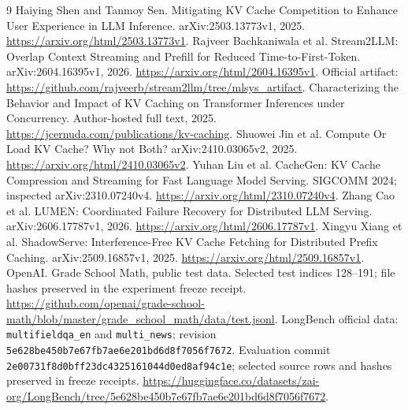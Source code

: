 \documentclass[UTF8,fontset=fandol,a4paper,10pt]{ctexart}
\newcommand{\code}[1]{\nolinkurl{#1}}
\begin{document}
\clearpage
\begin{thebibliography}{9}
\footnotesize
\setlength{\itemsep}{1pt}
 Haiying Shen and Tanmoy Sen. Mitigating KV Cache Competition to Enhance User Experience in LLM Inference. arXiv:2503.13773v1, 2025. \url{https://arxiv.org/html/2503.13773v1}.
 Rajveer Bachkaniwala et al. Stream2LLM: Overlap Context Streaming and Prefill for Reduced Time-to-First-Token. arXiv:2604.16395v1, 2026. \url{https://arxiv.org/html/2604.16395v1}. Official artifact: \url{https://github.com/rajveerb/stream2llm/tree/mlsys_artifact}.
 Characterizing the Behavior and Impact of KV Caching on Transformer Inferences under Concurrency. Author-hosted full text, 2025. \url{https://jcernuda.com/publications/kv-caching}.
 Shuowei Jin et al. Compute Or Load KV Cache? Why not Both? arXiv:2410.03065v2, 2025. \url{https://arxiv.org/html/2410.03065v2}.
 Yuhan Liu et al. CacheGen: KV Cache Compression and Streaming for Fast Language Model Serving. SIGCOMM 2024; inspected arXiv:2310.07240v4. \url{https://arxiv.org/html/2310.07240v4}.
 Zhang Cao et al. LUMEN: Coordinated Failure Recovery for Distributed LLM Serving. arXiv:2606.17787v1, 2026. \url{https://arxiv.org/html/2606.17787v1}.
 Xingyu Xiang et al. ShadowServe: Interference-Free KV Cache Fetching for Distributed Prefix Caching. arXiv:2509.16857v1, 2025. \url{https://arxiv.org/html/2509.16857v1}.
 OpenAI. Grade School Math, public test data. Selected test indices 128--191; file hashes preserved in the experiment freeze receipt. \url{https://github.com/openai/grade-school-math/blob/master/grade_school_math/data/test.jsonl}.
 LongBench official data: \code{multifieldqa_en} and \code{multi_news}; revision \code{5e628be450b7e67fb7ae6e201bd6d8f7056f7672}. Evaluation commit \code{2e00731f8d0bff23dc4325161044d0ed8af94c1e}; selected source rows and hashes preserved in freeze receipts. \url{https://huggingface.co/datasets/zai-org/LongBench/tree/5e628be450b7e67fb7ae6e201bd6d8f7056f7672}.
\end{thebibliography}
\end{document}
